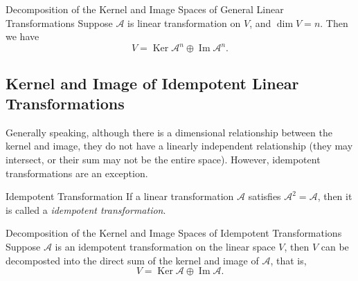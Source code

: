 \begin{theorem}{Decomposition of the Kernel and Image Spaces of General Linear Transformations}{}
  Suppose $\mathcal{A}$ is linear transformation on $V$,
  and $\dim V = n$. Then we have
  \begin{equation}
    V = \operatorname{Ker} \mathcal{A}^n \oplus \operatorname{Im} \mathcal{A}^n.
  \end{equation}
\end{theorem}

\subsection{Kernel and Image of Idempotent Linear Transformations}

Generally speaking, although there is a dimensional relationship between the
kernel and image, they do not have a linearly independent relationship
(they may intersect, or their sum may not be the entire space).
However, idempotent transformations are an exception.

\begin{definition}{Idempotent Transformation}{}
  If a linear transformation $\mathcal{A}$ satisfies $\mathcal{A}^2 =
  \mathcal{A}$,
  then it is called a \emph{idempotent transformation}.
\end{definition}

\begin{theorem}{Decomposition of the Kernel and Image Spaces of Idempotent Transformations}{}
  Suppose $\mathcal{A}$ is an idempotent transformation on the linear space $V$,
  then $V$ can be decomposted into the direct sum of the kernel and image of
  $\mathcal{A}$,
  that is,
  \begin{equation}
    V = \operatorname{Ker} \mathcal{A} \oplus \operatorname{Im} \mathcal{A}.
  \end{equation}
\end{theorem}

